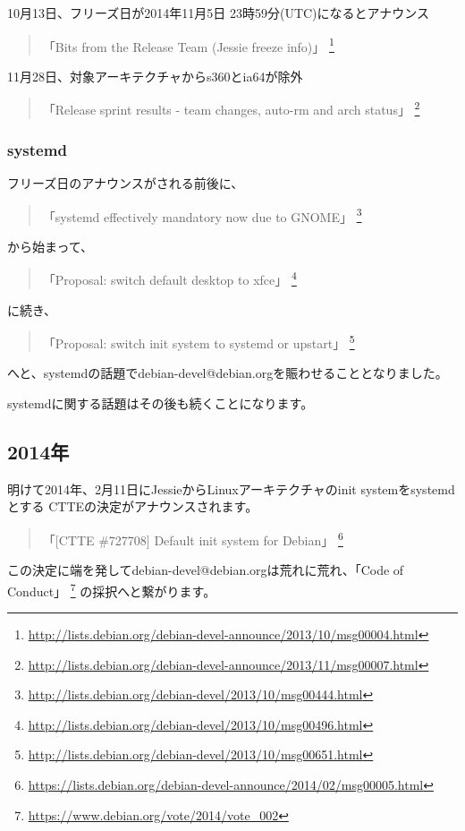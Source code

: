 \documentclass[mingoth,a4paper]{jsarticle}
\begin{document}
10月13日、フリーズ日が2014年11月5日 23時59分(UTC)になるとアナウンス
\begin{quote}
  「Bits from the Release Team (Jessie freeze info)」
  \footnote{\url{http://lists.debian.org/debian-devel-announce/2013/10/msg00004.html}}
\end{quote}

11月28日、対象アーキテクチャからs360とia64が除外
\begin{quote}
  「Release sprint results - team changes, auto-rm and arch status」
  \footnote{\url{http://lists.debian.org/debian-devel-announce/2013/11/msg00007.html}}
\end{quote}


\subsubsection{systemd}

フリーズ日のアナウンスがされる前後に、
\begin{quote}
  「systemd effectively mandatory now due to GNOME」
  \footnote{\url{http://lists.debian.org/debian-devel/2013/10/msg00444.html}}
\end{quote}
から始まって、
\begin{quote}
  「Proposal: switch default desktop to xfce」
  \footnote{\url{http://lists.debian.org/debian-devel/2013/10/msg00496.html}}
\end{quote}
に続き、
\begin{quote}
  「Proposal: switch init system to systemd or upstart」
  \footnote{\url{http://lists.debian.org/debian-devel/2013/10/msg00651.html}}
\end{quote}
へと、systemdの話題でdebian-devel@debian.orgを賑わせることとなりました。

systemdに関する話題はその後も続くことになります。


\subsection{2014年}

明けて2014年、2月11日にJessieからLinuxアーキテクチャのinit systemをsystemdとする
CTTEの決定がアナウンスされます。
\begin{quote}
  「[CTTE \#727708] Default init system for Debian」
  \footnote{\url{https://lists.debian.org/debian-devel-announce/2014/02/msg00005.html}}
\end{quote}

この決定に端を発してdebian-devel@debian.orgは荒れに荒れ、「Code of Conduct」
\footnote{\url{https://www.debian.org/vote/2014/vote_002}}
の採択へと繋がります。
\end{document}

